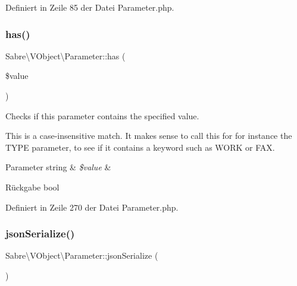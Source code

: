Definiert in Zeile 85 der Datei Parameter.\+php.

\mbox{\label{class_sabre_1_1_v_object_1_1_parameter_a2d9a335e83c3e3f7847a8ce64f47baa1}} 
\subsubsection{\texorpdfstring{has()}{has()}}
{\footnotesize\ttfamily Sabre\textbackslash{}\+V\+Object\textbackslash{}\+Parameter\+::has (\begin{DoxyParamCaption}\item[{}]{\$value }\end{DoxyParamCaption})}

Checks if this parameter contains the specified value.

This is a case-\/insensitive match. It makes sense to call this for for instance the T\+Y\+PE parameter, to see if it contains a keyword such as \textquotesingle{}W\+O\+RK\textquotesingle{} or \textquotesingle{}F\+AX\textquotesingle{}.


\begin{DoxyParams}[1]{Parameter}
string & {\em \$value} & \\
\hline
\end{DoxyParams}
\begin{DoxyReturn}{Rückgabe}
bool 
\end{DoxyReturn}


Definiert in Zeile 270 der Datei Parameter.\+php.

\mbox{\label{class_sabre_1_1_v_object_1_1_parameter_a6a6ee0974478dc6111b5dd7854e4cbb2}} 
\subsubsection{\texorpdfstring{json\+Serialize()}{jsonSerialize()}}
{\footnotesize\ttfamily Sabre\textbackslash{}\+V\+Object\textbackslash{}\+Parameter\+::json\+Serialize (\begin{DoxyParamCaption}{ }\end{DoxyParamCaption})}

